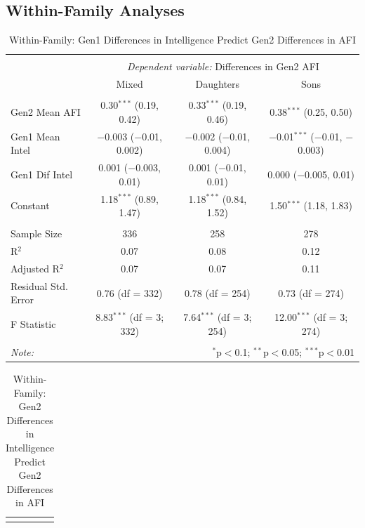 \documentclass[a4paper,man,apacite,natbib,12pt,longtable]{apa6}\usepackage[]{graphicx}\usepackage[]{color}
\begin{document}
\begin{landscape}
  \subsection{Within-Family Analyses}
  \begin{longtable}{@{\extracolsep{5pt}}lccc} 
  \caption{Within-Family: Gen1 Differences in Intelligence Predict Gen2 Differences in AFI}\label{table_Dif_Mom_Intelligence_Dif_Child_AFI_11}
  \\[-1.8ex]\hline 
  \hline \\[-3.8ex] 
  & \multicolumn{3}{c}{\textit{Dependent variable:} Differences in Gen2 AFI} \\ 
  \cline{2-4}
   & Mixed & Daughters & Sons \\ 
\hline \\[-1.8ex] 
 Gen2 Mean AFI & 0.30$^{***}$ (0.19, 0.42) & 0.33$^{***}$ (0.19, 0.46) & 0.38$^{***}$ (0.25, 0.50) \\ 
  Gen1 Mean Intel & $-$0.003 ($-$0.01, 0.002) & $-$0.002 ($-$0.01, 0.004) & $-$0.01$^{***}$ ($-$0.01, $-$0.003) \\ 
  Gen1 Dif Intel & 0.001 ($-$0.003, 0.01) & 0.001 ($-$0.01, 0.01) & 0.000 ($-$0.005, 0.01) \\ 
  Constant & 1.18$^{***}$ (0.89, 1.47) & 1.18$^{***}$ (0.84, 1.52) & 1.50$^{***}$ (1.18, 1.83) \\ 
 \hline \\[-1.8ex] 
Sample Size & 336 & 258 & 278 \\ 
R$^{2}$ & 0.07 & 0.08 & 0.12 \\ 
Adjusted R$^{2}$ & 0.07 & 0.07 & 0.11 \\ 
Residual Std. Error & 0.76 (df = 332) & 0.78 (df = 254) & 0.73 (df = 274) \\ 
F Statistic & 8.83$^{***}$ (df = 3; 332) & 7.64$^{***}$ (df = 3; 254) & 12.00$^{***}$ (df = 3; 274) \\ 
\hline 
\hline \\[-1.8ex] 
\textit{Note:}  & \multicolumn{3}{r}{$^{*}$p$<$0.1; $^{**}$p$<$0.05; $^{***}$p$<$0.01} \\ 
  \end{longtable}\pagebreak
  \begin{longtable}{@{\extracolsep{5pt}}lccc} 
  \caption{Within-Family: Gen2 Differences in Intelligence Predict Gen2 Differences in AFI} \label{table_Dif_Child_Intelligence_Dif_Child_AFI_11}
  \\[-1.8ex]\hline 
  \hline \\[-3.8ex] 

\end{longtable}
\end{landscape}
\end{document}
